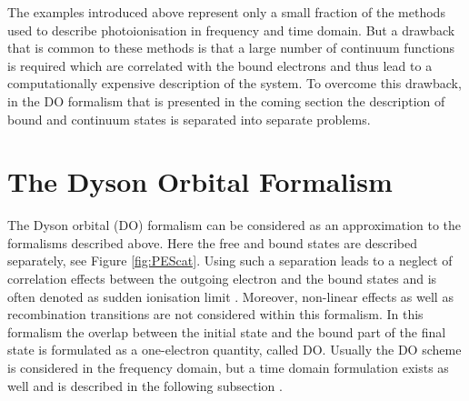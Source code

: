 The examples introduced above represent only a small fraction of the methods used to describe photoionisation in frequency and time domain.
But a drawback that is common to these methods is that a large number of continuum functions is required which are correlated with the bound electrons and thus lead to a computationally expensive description of the system.
To overcome this drawback, in the DO formalism that is presented in the coming section the description of bound and continuum states is separated into separate problems.

%

\section{The Dyson Orbital Formalism}
\label{ch:do}
The Dyson orbital (DO) formalism can be considered as an approximation to the formalisms described above.
Here the free and bound states are described separately, see Figure \ref{fig:PEScat}.
Using such a separation leads to a neglect of correlation effects between the outgoing electron and the bound states and is often denoted as sudden ionisation limit \cite{ezDyson,MAgg}.
Moreover, non-linear effects as well as recombination transitions are not considered within this formalism.
In this formalism the overlap between the initial state and the bound part of the final state is formulated as a one-electron quantity, called DO.
Usually the DO scheme is considered in the frequency domain, but a time domain formulation exists as well and is described in the following subsection \cite{TD-do}.

